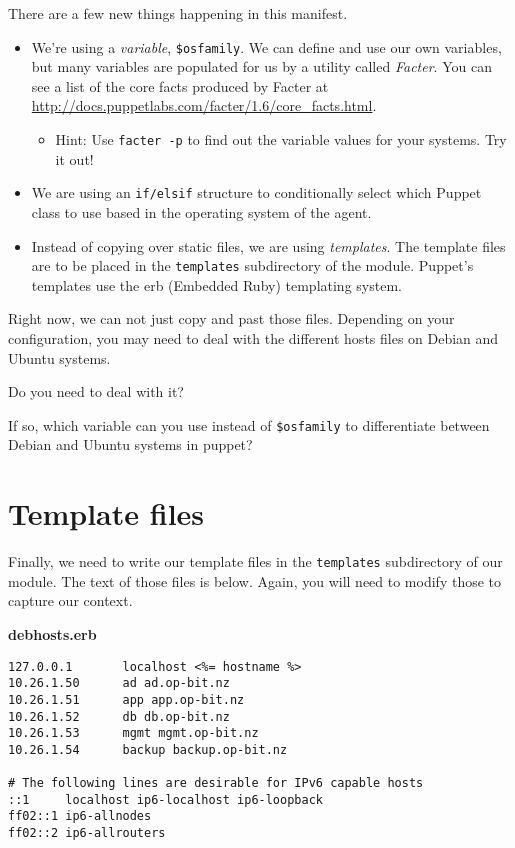\documentclass{article}   	%
\begin{document}

There are a few new things happening in this manifest.
\begin{itemize}
  \item We're using a \emph{variable}, \texttt{\$osfamily}.  We can define and use our own variables, but many variables are populated for us by a utility called \emph{Facter}.  You can see a list of the core facts produced by Facter at \\ 
  \url{http://docs.puppetlabs.com/facter/1.6/core_facts.html}.
  \begin{itemize}
  \item Hint: Use {\tt facter -p} to find out the variable values for your systems. Try it out!
  \end{itemize}
  \item We are using an \texttt{if/elsif} structure to conditionally select which Puppet class to use based in the operating system of the agent.
  \item Instead of copying over static files, we are using \emph{templates}.  The template files are to be placed in the \texttt{templates} subdirectory of the module.  Puppet's templates use the erb (Embedded Ruby) templating system.
\end{itemize}

Right now, we can not just copy and past those files. Depending on your configuration, you may need to deal with the different hosts files on Debian and Ubuntu systems.

Do you need to deal with it?

\vspace{0.5cm}

If so, which variable can you use instead of {\tt \$osfamily} to differentiate between Debian and Ubuntu systems in puppet?



\section{Template files}
Finally, we need to write our template files in the \texttt{templates} subdirectory of our module.  The text of those files is below. Again, you will need to modify those to capture our context.

\textbf{debhosts.erb}
\begin{verbatim}
127.0.0.1       localhost <%= hostname %>
10.26.1.50      ad ad.op-bit.nz
10.26.1.51      app app.op-bit.nz
10.26.1.52      db db.op-bit.nz
10.26.1.53      mgmt mgmt.op-bit.nz
10.26.1.54      backup backup.op-bit.nz

# The following lines are desirable for IPv6 capable hosts
::1     localhost ip6-localhost ip6-loopback
ff02::1 ip6-allnodes
ff02::2 ip6-allrouters
\end{verbatim}
\end{document}
